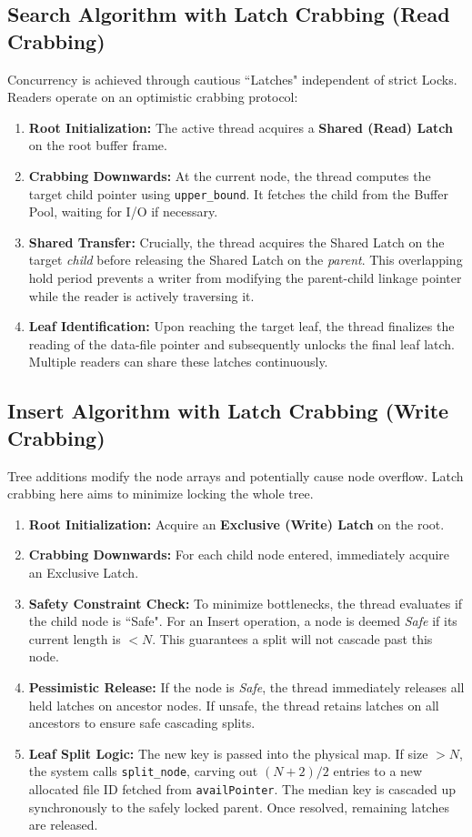 \documentclass[12pt, a4paper]{article}
\begin{document}
\subsection{Search Algorithm with Latch Crabbing (Read Crabbing)}
Concurrency is achieved through cautious ``Latches" independent of strict Locks. Readers operate on an optimistic crabbing protocol:
\begin{enumerate}
    \item \textbf{Root Initialization:} The active thread acquires a \textbf{Shared (Read) Latch} on the root buffer frame.
    \item \textbf{Crabbing Downwards:} At the current node, the thread computes the target child pointer using \texttt{upper\_bound}. It fetches the child from the Buffer Pool, waiting for I/O if necessary.
    \item \textbf{Shared Transfer:} Crucially, the thread acquires the Shared Latch on the target \textit{child} before releasing the Shared Latch on the \textit{parent}. This overlapping hold period prevents a writer from modifying the parent-child linkage pointer while the reader is actively traversing it.
    \item \textbf{Leaf Identification:} Upon reaching the target leaf, the thread finalizes the reading of the data-file pointer and subsequently unlocks the final leaf latch. Multiple readers can share these latches continuously.
\end{enumerate}

\subsection{Insert Algorithm with Latch Crabbing (Write Crabbing)}
Tree additions modify the node arrays and potentially cause node overflow. Latch crabbing here aims to minimize locking the whole tree.
\begin{enumerate}
    \item \textbf{Root Initialization:} Acquire an \textbf{Exclusive (Write) Latch} on the root.
    \item \textbf{Crabbing Downwards:} For each child node entered, immediately acquire an Exclusive Latch.
    \item \textbf{Safety Constraint Check:} To minimize bottlenecks, the thread evaluates if the child node is ``Safe". For an Insert operation, a node is deemed \textit{Safe} if its current length is $< N$. This guarantees a split will not cascade past this node.
    \item \textbf{Pessimistic Release:} If the node is \textit{Safe}, the thread immediately releases all held latches on ancestor nodes. If unsafe, the thread retains latches on all ancestors to ensure safe cascading splits.
    \item \textbf{Leaf Split Logic:} The new key is passed into the physical map. If size $> N$, the system calls \texttt{split\_node}, carving out $(N+2)/2$ entries to a new allocated file ID fetched from \texttt{availPointer}. The median key is cascaded up synchronously to the safely locked parent. Once resolved, remaining latches are released.
\end{enumerate}
\end{document}
